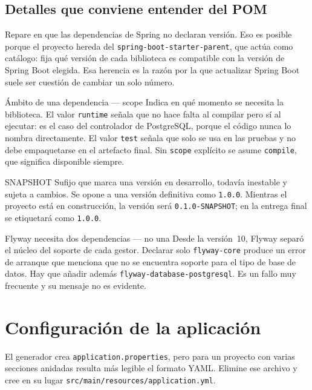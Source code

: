 \documentclass[11pt,a4paper,openany]{book}
\begin{document}
\subsection{Detalles que conviene entender del POM}
\label{sec:pom-detalles}

Repare en que las dependencias de Spring no declaran versión. Eso es posible porque el proyecto hereda del \texttt{spring-boot-starter-parent}, que actúa como catálogo: fija qué versión de cada biblioteca es compatible con la versión de Spring Boot elegida. Esa herencia es la razón por la que actualizar Spring Boot suele ser cuestión de cambiar un solo número.

\begin{cajadefinicion}{Ámbito de una dependencia --- scope}
	Indica en qué momento se necesita la biblioteca. El valor \texttt{runtime} señala que no hace falta al compilar pero sí al ejecutar: es el caso del controlador de PostgreSQL, porque el código nunca lo nombra directamente. El valor \texttt{test} señala que solo se usa en las pruebas y no debe empaquetarse en el artefacto final. Sin \texttt{scope} explícito se asume \texttt{compile}, que significa disponible siempre.
\end{cajadefinicion}

\begin{cajadefinicion}{SNAPSHOT}
	Sufijo que marca una versión en desarrollo, todavía inestable y sujeta a cambios. Se opone a una versión definitiva como \texttt{1.0.0}. Mientras el proyecto está en construcción, la versión será \texttt{0.1.0-SNAPSHOT}; en la entrega final se etiquetará como \texttt{1.0.0}.
\end{cajadefinicion}

\begin{cajaadvertencia}{Flyway necesita dos dependencias --- no una}
	Desde la versión~10, Flyway separó el núcleo del soporte de cada gestor. Declarar solo \texttt{flyway-core} produce un error de arranque que menciona que no se encuentra soporte para el tipo de base de datos. Hay que añadir además \texttt{flyway-database-postgresql}. Es un fallo muy frecuente y su mensaje no es evidente.
\end{cajaadvertencia}

\section{Configuración de la aplicación}
\label{sec:configuracion}

El generador crea \texttt{application.properties}, pero para un proyecto con varias secciones anidadas resulta más legible el formato YAML. Elimine ese archivo y cree en su lugar \texttt{src/main/resources/application.yml}.
\end{document}
